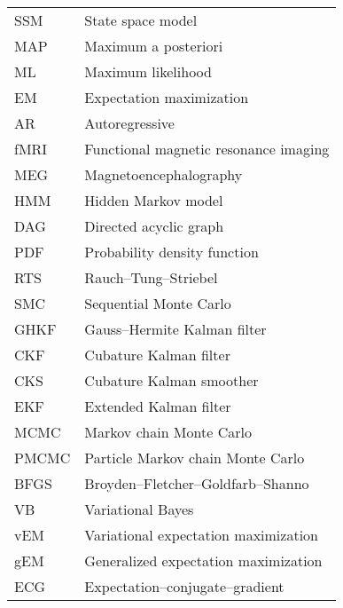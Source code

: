 \begin{tabular}{ll}
SSM & State space model \\
MAP & Maximum a posteriori \\
ML & Maximum likelihood \\
EM & Expectation maximization \\
AR & Autoregressive \\
fMRI & Functional magnetic resonance imaging \\
MEG & Magnetoencephalography \\
HMM & Hidden Markov model \\
DAG & Directed acyclic graph \\
PDF & Probability density function \\
RTS & Rauch--Tung--Striebel \\
SMC & Sequential Monte Carlo \\
GHKF & Gauss--Hermite Kalman filter \\
CKF & Cubature Kalman filter \\
CKS & Cubature Kalman smoother \\
EKF & Extended Kalman filter \\
MCMC & Markov chain Monte Carlo \\
PMCMC & Particle Markov chain Monte Carlo \\
BFGS & Broyden--Fletcher--Goldfarb--Shanno\\
VB & Variational Bayes \\
vEM & Variational expectation maximization \\
gEM & Generalized expectation maximization \\
ECG & Expectation--conjugate--gradient
\end{tabular}